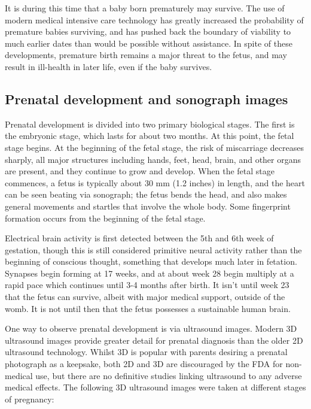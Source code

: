 \documentclass[12pt,a4paper,onecolumn]{article}
\begin{document}
It is during this time that a baby born prematurely may survive. The use of modern medical intensive
care technology has greatly increased the probability of premature babies surviving, and has pushed
back the boundary of viability to much earlier dates than would be possible without assistance. In
spite of these developments, premature birth remains a major threat to the fetus, and may result in
ill-health in later life, even if the baby survives.

\subsection{Prenatal development and sonograph images}

Prenatal development is divided into two primary biological stages. The first is the embryonic
stage, which lasts for about two months. At this point, the fetal stage begins. At the beginning of
the fetal stage, the risk of miscarriage decreases sharply, all major structures including hands,
feet, head, brain, and other organs are present, and they continue to grow and develop. When the
fetal stage commences, a fetus is typically about 30 mm (1.2 inches) in length, and the heart can be
seen beating via sonograph; the fetus bends the head, and also makes general movements and startles
that involve the whole body. Some fingerprint formation occurs from the beginning of the fetal
stage.

Electrical brain activity is first detected between the 5th and 6th week of gestation, though this
is still considered primitive neural activity rather than the beginning of conscious thought,
something that develops much later in fetation. Synapses begin forming at 17 weeks, and at about
week 28 begin multiply at a rapid pace which continues until 3-4 months after birth. It isn't until
week 23 that the fetus can survive, albeit with major medical support, outside of the womb. It is
not until then that the fetus possesses a sustainable human brain. 

One way to observe prenatal development is via ultrasound images. Modern 3D ultrasound images
provide greater detail for prenatal diagnosis than the older 2D ultrasound technology. Whilst 3D is
popular with parents desiring a prenatal photograph as a keepsake, both 2D and 3D are discouraged by
the FDA for non-medical use, but there are no definitive studies linking ultrasound to any adverse
medical effects. The following 3D ultrasound images were taken at different stages of pregnancy:

\begin{center}
%
%
%
\end{center}

\end{document}

